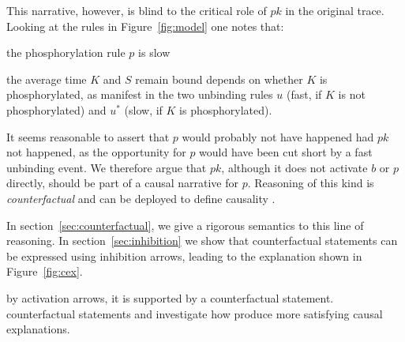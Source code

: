 This narrative, however, is blind to the critical role of $pk$ in the
original trace. Looking at the rules in Figure~\ref{fig:model} one
notes that:
\begin{inparaenum}[(i)]
\item the phosphorylation rule $p$ is slow
\item the average time $K$ and $S$ remain bound depends on whether $K$
  is phosphorylated, as manifest in the two unbinding rules $u$ (fast,
  if $K$ is not phosphorylated) and $u^{*}$ (slow, if $K$ is
  phosphorylated).
\end{inparaenum} It seems reasonable to assert that $p$ would probably
not have happened had $pk$ not happened, as the opportunity for $p$
would have been cut short by a fast unbinding event. We therefore
argue that $pk$, although it does not activate $b$ or $p$ directly,
should be part of a causal narrative for $p$. Reasoning of this kind
is \textit{counterfactual} and can be deployed to define causality
\cite{lewis1974causation,lewis2000causation}.

In section~\ref{sec:counterfactual}, we give a rigorous semantics to
this line of reasoning. In section~\ref{sec:inhibition} we show that
counterfactual statements can be expressed using inhibition arrows,
leading to the explanation shown in Figure~\ref{fig:cex}.

by activation arrows, it is supported by a counterfactual statement.
counterfactual statements and investigate how %
produce more satisfying causal explanations.